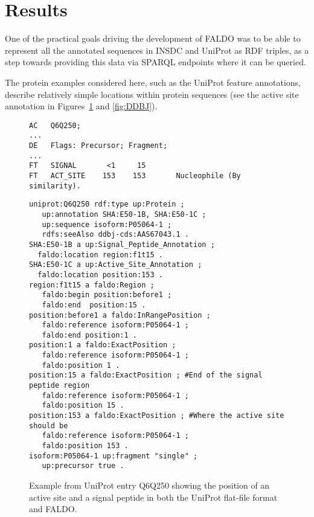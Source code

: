 \section*{Results}
One of the practical goals driving the development of FALDO was to be able
to represent all the annotated sequences in INSDC and UniProt as RDF
triples, as a step towards providing this data via SPARQL endpoints where
it can be queried.

The protein examples considered here, such as the UniProt feature annotations,
describe relatively simple locations within protein sequences
(see the active site annotation in Figures~\ref{fig:UniProt} and \ref{fig:DDBJ}).

\begin{figure}
\begin{shaded}
\small
\begin{verbatim}
AC   Q6Q250;
...
DE   Flags: Precursor; Fragment;
...
FT   SIGNAL       <1     15
FT   ACT_SITE    153    153       Nucleophile (By similarity).
\end{verbatim}
\begin{verbatim}
uniprot:Q6Q250 rdf:type up:Protein ;
   up:annotation SHA:E50-1B, SHA:E50-1C ;
   up:sequence isoform:P05064-1 ;
   rdfs:seeAlso ddbj-cds:AAS67043.1 .
SHA:E50-1B a up:Signal_Peptide_Annotation ;
  faldo:location region:f1t15 .
SHA:E50-1C a up:Active_Site_Annotation ;
  faldo:location position:153 .
region:f1t15 a faldo:Region ;
   faldo:begin position:before1 ;
   faldo:end  position:15 .
position:before1 a faldo:InRangePosition ;
   faldo:reference isoform:P05064-1 ;
   faldo:end position:1 . 
position:1 a faldo:ExactPosition ;
   faldo:reference isoform:P05064-1 ;
   faldo:position 1 .
position:15 a faldo:ExactPosition ; #End of the signal peptide region
   faldo:reference isoform:P05064-1 ;
   faldo:position 15 .   
position:153 a faldo:ExactPosition ; #Where the active site should be
   faldo:reference isoform:P05064-1 ;
   faldo:position 153 .
isoform:P05064-1 up:fragment "single" ;
   up:precursor true .
\end{verbatim}
\end{shaded}
\caption{Example from UniProt entry Q6Q250 showing the position of an active site and a signal peptide in both the UniProt flat-file format and FALDO.}
\label{fig:UniProt}
\end{figure}
